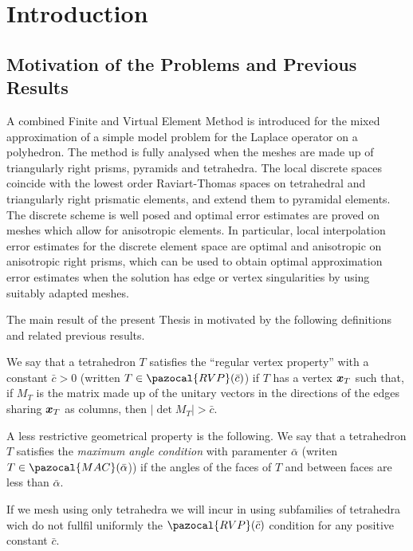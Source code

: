 \chapter{Introduction}
\section{Motivation of the Problems and Previous Results} %

A combined Finite and Virtual Element Method is introduced for the 
mixed approximation of a 
simple model problem for the Laplace operator on a polyhedron. The 
method is fully analysed when the meshes are made up of triangularly
right prisms, pyramids and tetrahedra. The local discrete 
spaces coincide with the lowest order Raviart-Thomas 
spaces on tetrahedral and triangularly right prismatic elements, and 
extend them to pyramidal elements. The discrete scheme 
is well posed and optimal error estimates are proved on meshes which 
allow for anisotropic elements. In particular, local 
interpolation error estimates for the discrete element space are 
optimal and anisotropic on anisotropic right prisms, which can be
used to obtain optimal approximation error estimates when the 
solution has edge or vertex singularities by using suitably adapted meshes.   

The main result of the present Thesis in motivated by the following
definitions and related previous results.

We say that a tetrahedron $T$ satisfies the ``regular vertex property'' with a
constant $\bar{c} > 0$ (written $T\in \pazocal{RVP}(\bar c)$) if $T$ has
 a vertex $\boldsymbol{x}_T$ such that,
if $M_T$ is the matrix made up of the unitary vectors in the directions
of the edges sharing $\boldsymbol{x}_T$ as columns, then $|\det M_T| > \bar{c}$.

A less restrictive geometrical property is the following. 
 We say that a tetrahedron $T$ satisfies the  {\it maximum angle condition} with paramenter $\bar\alpha$
(writen $T\in\pazocal{MAC}(\bar\alpha$))  if the angles of the faces of 
$T$ and between faces are 
less than $\bar\alpha$. 

If we mesh using only tetrahedra we will incur in using subfamilies of tetrahedra
wich do not fullfil uniformly the $\pazocal{RVP}(\bar c)$ condition for any positive constant $\bar c$.

